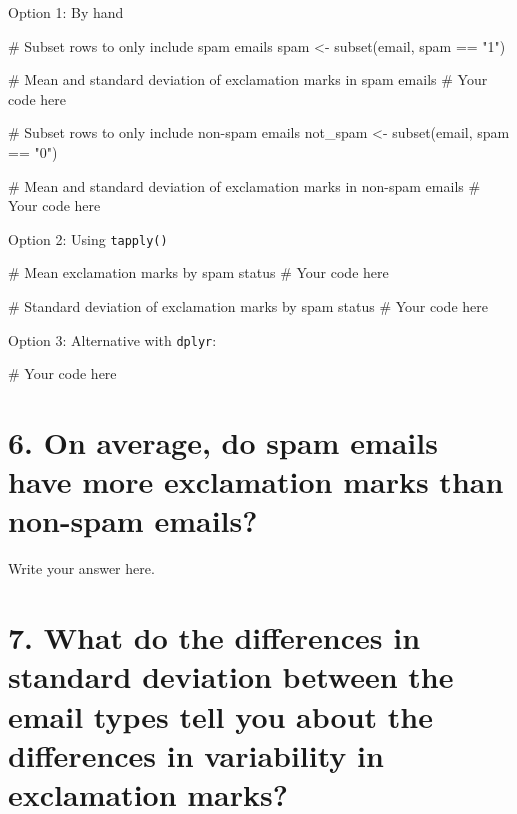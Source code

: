 \documentclass[
  letterpaper,
  DIV=11,
  numbers=noendperiod]{scrreprt}
\newenvironment{Shaded}{\begin{snugshade}}{\end{snugshade}}
\newcommand{\CommentTok}[1]{\textcolor[rgb]{0.37,0.37,0.37}{#1}}
\newcommand{\FunctionTok}[1]{\textcolor[rgb]{0.28,0.35,0.67}{#1}}
\newcommand{\NormalTok}[1]{\textcolor[rgb]{0.00,0.23,0.31}{#1}}
\newcommand{\OtherTok}[1]{\textcolor[rgb]{0.00,0.23,0.31}{#1}}
\newcommand{\SpecialCharTok}[1]{\textcolor[rgb]{0.37,0.37,0.37}{#1}}
\newcommand{\StringTok}[1]{\textcolor[rgb]{0.13,0.47,0.30}{#1}}
\begin{document}
Option 1: By hand

\begin{Shaded}
\begin{Highlighting}[]
\CommentTok{\# Subset rows to only include spam emails}
\NormalTok{spam }\OtherTok{\textless{}{-}} \FunctionTok{subset}\NormalTok{(email, spam }\SpecialCharTok{==} \StringTok{"1"}\NormalTok{)}

\CommentTok{\# Mean and standard deviation of exclamation marks in spam emails}
\CommentTok{\# Your code here}


\CommentTok{\# Subset rows to only include non{-}spam emails}
\NormalTok{not\_spam }\OtherTok{\textless{}{-}} \FunctionTok{subset}\NormalTok{(email, spam }\SpecialCharTok{==} \StringTok{"0"}\NormalTok{)}

\CommentTok{\# Mean and standard deviation of exclamation marks in non{-}spam emails}
\CommentTok{\# Your code here}
\end{Highlighting}
\end{Shaded}

Option 2: Using \texttt{tapply()}

\begin{Shaded}
\begin{Highlighting}[]
\CommentTok{\# Mean exclamation marks by spam status}
\CommentTok{\# Your code here}

\CommentTok{\# Standard deviation of exclamation marks by spam status}
\CommentTok{\# Your code here}
\end{Highlighting}
\end{Shaded}

Option 3: Alternative with \texttt{dplyr}:

\begin{Shaded}
\begin{Highlighting}[]
\CommentTok{\# Your code here}
\end{Highlighting}
\end{Shaded}

\section{6. On average, do spam emails have more exclamation marks than
non-spam
emails?}\label{on-average-do-spam-emails-have-more-exclamation-marks-than-non-spam-emails}

Write your answer here.

\section{7. What do the differences in standard deviation between the
email types tell you about the differences in variability in exclamation
marks?}\label{what-do-the-differences-in-standard-deviation-between-the-email-types-tell-you-about-the-differences-in-variability-in-exclamation-marks}
\end{document}
